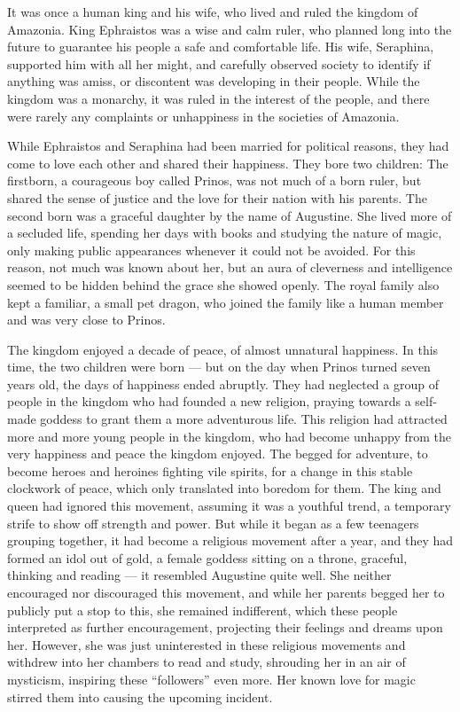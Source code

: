 It was once a human king and his wife, who lived and ruled the kingdom of Amazonia. King Ephraistos was a wise and calm ruler, who planned long into the future to guarantee his people a safe and comfortable life. His wife, Seraphina, supported him with all her might, and carefully observed society to identify if anything was amiss, or discontent was developing in their people. While the kingdom was a monarchy, it was ruled in the interest of the people, and there were rarely any complaints or unhappiness in the societies of Amazonia.

While Ephraistos and Seraphina had been married for political reasons, they had come to love each other and shared their happiness. They bore two children: The firstborn, a courageous boy called Prinos, was not much of a born ruler, but shared the sense of justice and the love for their nation with his parents. The second born was a graceful daughter by the name of Augustine. She lived more of a secluded life, spending her days with books and studying the nature of magic, only making public appearances whenever it could not be avoided. For this reason, not much was known about her, but an aura of cleverness and intelligence seemed to be hidden behind the grace she showed openly. The royal family also kept a familiar, a small pet dragon, who joined the family like a human member and was very close to Prinos.

The kingdom enjoyed a decade of peace, of almost unnatural happiness. In this time, the two children were born --- but on the day when Prinos turned seven years old, the days of happiness ended abruptly. They had neglected a group of people in the kingdom who had founded a new religion, praying towards a self-made goddess to grant them a more adventurous life. This religion had attracted more and more young people in the kingdom, who had become unhappy from the very happiness and peace the kingdom enjoyed. The begged for adventure, to become heroes and heroines fighting vile spirits, for a change in this stable clockwork of peace, which only translated into boredom for them. The king and queen had ignored this movement, assuming it was a youthful trend, a temporary strife to show off strength and power. But while it began as a few teenagers grouping together, it had become a religious movement after a year, and they had formed an idol out of gold, a female goddess sitting on a throne, graceful, thinking and reading --- it resembled Augustine quite well. She neither encouraged nor discouraged this movement, and while her parents begged her to publicly put a stop to this, she remained indifferent, which these people interpreted as further encouragement, projecting their feelings and dreams upon her. However, she was just uninterested in these religious movements and withdrew into her chambers to read and study, shrouding her in an air of mysticism, inspiring these \enquote{followers} even more. Her known love for magic stirred them into causing the upcoming incident.

